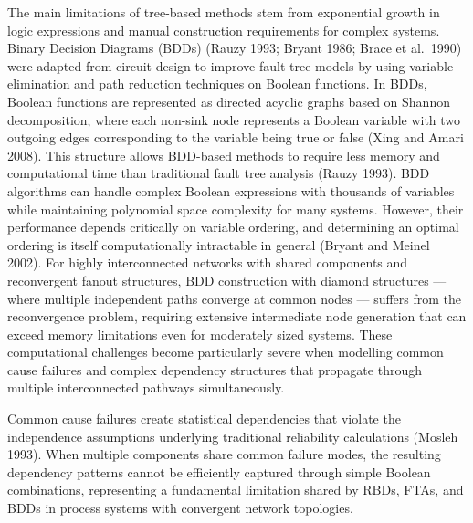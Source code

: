 \documentclass[preprint,12pt]{elsarticle}
\theoremstyle{definition}
\begin{document}
The main limitations of tree-based methods stem from exponential growth in logic expressions and manual
construction requirements for complex systems. Binary Decision Diagrams (BDDs) (Rauzy 1993; Bryant 1986;
Brace et al.\ 1990) were adapted from circuit design to improve fault tree models by using variable
elimination and path reduction techniques on Boolean functions. In BDDs, Boolean functions are
represented as directed acyclic graphs based on Shannon decomposition, where each non-sink node
represents a Boolean variable with two outgoing edges corresponding to the variable being true or false
(Xing and Amari 2008). This structure allows BDD-based methods to require less memory and computational
time than traditional fault tree analysis (Rauzy 1993). BDD algorithms can handle complex Boolean
expressions with thousands of variables while maintaining polynomial space complexity for many systems.
However, their performance depends critically on variable ordering, and determining an optimal ordering
is itself computationally intractable in general (Bryant and Meinel 2002). For highly interconnected
networks with shared components and reconvergent fanout structures, BDD construction with diamond
structures --- where multiple independent paths converge at common nodes --- suffers from the
reconvergence problem, requiring extensive intermediate node generation that can exceed memory
limitations even for moderately sized systems. These computational challenges become particularly severe
when modelling common cause failures and complex dependency structures that propagate through multiple
interconnected pathways simultaneously.

Common cause failures create statistical dependencies that violate the independence assumptions
underlying traditional reliability calculations (Mosleh 1993). When multiple components share common
failure modes, the resulting dependency patterns cannot be efficiently captured through simple Boolean
combinations, representing a fundamental limitation shared by RBDs, FTAs, and BDDs in process systems
with convergent network topologies.
\end{document}
